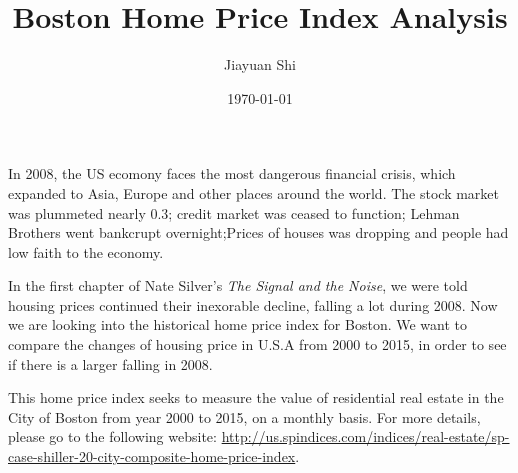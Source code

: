 \documentclass[t,ucs,12pt,xcolor=dvipsnames]{beamer}
\title{Boston Home Price Index Analysis}
\author{Jiayuan Shi}
\date{\today}
\begin{document}





\maketitle

In 2008, the US ecomony faces the most dangerous financial crisis, which expanded to Asia, Europe and other places around the world. The stock market was plummeted nearly 0.3; credit market was ceased to function; Lehman Brothers went bankcrupt overnight;Prices of houses was dropping and people had low faith to the economy.\

In the first chapter of Nate Silver's \textit{The Signal and the Noise}, we were told housing prices continued their inexorable decline, falling a lot during 2008. Now we are looking into the historical home price index for Boston. We want to compare the changes of housing price in U.S.A from 2000 to 2015, in order to see if there is a larger falling in 2008.\

This home price index seeks to measure the value of residential real estate in the City of Boston from year 2000 to 2015, on a monthly basis. For more details, please go to the following website: \url{http://us.spindices.com/indices/real-estate/sp-case-shiller-20-city-composite-home-price-index}. 
\end{document}
